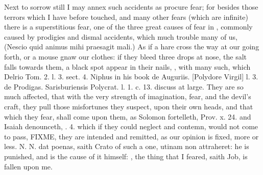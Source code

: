 {{Next to sorrow still I may annex such accidents as procure fear; for
besides those terrors which I have before touched, and many other
fears (which are infinite) there is a superstitious fear, one of the
three great causes of fear in \Aristotle, commonly caused by prodigies
and dismal accidents, which much trouble many of us, (Nescio quid
animus mihi praesagit mali.) As if a hare cross the way at our going
forth, or a mouse gnaw our clothes: if they bleed three drops at nose,
the salt falls towards them, a black spot appear in their nails, \etc{},
with many such, which Delrio Tom. 2. l. 3. sect. 4. \Austin{} Niphus in
his book \textlatin{de Auguriis.} [Polydore Virgil] l. 3. \textlatin{de Prodigas. Sarisburiensis}
Polycrat. l. 1. c. 13. discuss at large. They are so much affected,
that with the very strength of imagination, fear, and the devil's
craft, they pull those misfortunes they suspect, upon their own
heads, and that which they fear, shall come upon them, as Solomon
fortelleth, Prov. x. 24. and Isaiah denounceth, . 4. which if
they could neglect and contemn, would not come to pass, FIXME, they are intended and remitted, as our opinion is fixed,
more or less. N. N. dat poenas, saith Crato of such a one, utinam
non attraheret: he is punished, and is the cause of it  himself:
, the thing that I feared,
saith Job, is fallen upon me.

}}
